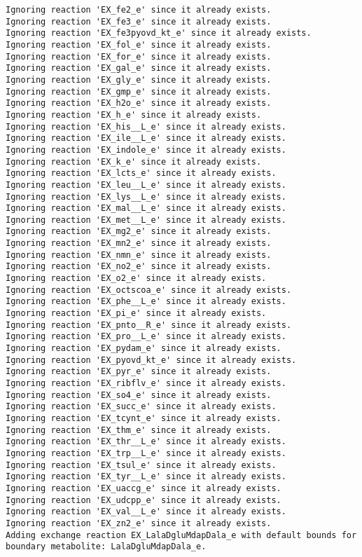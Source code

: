 \documentclass[
  letterpaper,
  DIV=11,
  numbers=noendperiod]{scrartcl}
\begin{document}
\begin{verbatim}
Ignoring reaction 'EX_fe2_e' since it already exists.
Ignoring reaction 'EX_fe3_e' since it already exists.
Ignoring reaction 'EX_fe3pyovd_kt_e' since it already exists.
Ignoring reaction 'EX_fol_e' since it already exists.
Ignoring reaction 'EX_for_e' since it already exists.
Ignoring reaction 'EX_gal_e' since it already exists.
Ignoring reaction 'EX_gly_e' since it already exists.
Ignoring reaction 'EX_gmp_e' since it already exists.
Ignoring reaction 'EX_h2o_e' since it already exists.
Ignoring reaction 'EX_h_e' since it already exists.
Ignoring reaction 'EX_his__L_e' since it already exists.
Ignoring reaction 'EX_ile__L_e' since it already exists.
Ignoring reaction 'EX_indole_e' since it already exists.
Ignoring reaction 'EX_k_e' since it already exists.
Ignoring reaction 'EX_lcts_e' since it already exists.
Ignoring reaction 'EX_leu__L_e' since it already exists.
Ignoring reaction 'EX_lys__L_e' since it already exists.
Ignoring reaction 'EX_mal__L_e' since it already exists.
Ignoring reaction 'EX_met__L_e' since it already exists.
Ignoring reaction 'EX_mg2_e' since it already exists.
Ignoring reaction 'EX_mn2_e' since it already exists.
Ignoring reaction 'EX_nmn_e' since it already exists.
Ignoring reaction 'EX_no2_e' since it already exists.
Ignoring reaction 'EX_o2_e' since it already exists.
Ignoring reaction 'EX_octscoa_e' since it already exists.
Ignoring reaction 'EX_phe__L_e' since it already exists.
Ignoring reaction 'EX_pi_e' since it already exists.
Ignoring reaction 'EX_pnto__R_e' since it already exists.
Ignoring reaction 'EX_pro__L_e' since it already exists.
Ignoring reaction 'EX_pydam_e' since it already exists.
Ignoring reaction 'EX_pyovd_kt_e' since it already exists.
Ignoring reaction 'EX_pyr_e' since it already exists.
Ignoring reaction 'EX_ribflv_e' since it already exists.
Ignoring reaction 'EX_so4_e' since it already exists.
Ignoring reaction 'EX_succ_e' since it already exists.
Ignoring reaction 'EX_tcynt_e' since it already exists.
Ignoring reaction 'EX_thm_e' since it already exists.
Ignoring reaction 'EX_thr__L_e' since it already exists.
Ignoring reaction 'EX_trp__L_e' since it already exists.
Ignoring reaction 'EX_tsul_e' since it already exists.
Ignoring reaction 'EX_tyr__L_e' since it already exists.
Ignoring reaction 'EX_uaccg_e' since it already exists.
Ignoring reaction 'EX_udcpp_e' since it already exists.
Ignoring reaction 'EX_val__L_e' since it already exists.
Ignoring reaction 'EX_zn2_e' since it already exists.
Adding exchange reaction EX_LalaDgluMdapDala_e with default bounds for boundary metabolite: LalaDgluMdapDala_e.

\end{verbatim}
\end{document}
